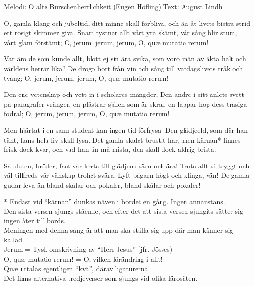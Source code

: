 \begin{song}

\begin{songmeta}
Melodi: O alte Burschenherrlichkeit (Eugen Höfling)
Text: August Lindh
\end{songmeta}

\begin{songtext}
O, gamla klang och jubeltid,
ditt minne skall förbliva,
och än åt livets bistra strid
ett rosigt skimmer giva.
Snart tystnar allt vårt yra skämt,
vår sång blir stum, vårt glam förstämt;
O, jerum, jerum, jerum,
O, quæ mutatio rerum!

Var äro de som kunde allt,
blott ej sin ära svika,
som voro män av äkta halt
och världens herrar lika?
De drogo bort från vin och sång
till vardagslivets tråk och tvång;
O, jerum, jerum, jerum,
O, quæ mutatio rerum!

Den ene vetenskap och vett
in i scholares mängder,
Den andre i sitt anlets svett
på paragrafer vränger,
en plåstrar själen som är skral,
en lappar hop dess trasiga fodral;
O, jerum, jerum, jerum,
O, quæ mutatio rerum!

Men hjärtat i en sann student
kan ingen tid förfrysa.
Den glädjeeld, som där han tänt,
hans hela liv skall lysa.
Det gamla skalet brustit har,
men kärnan* finnes frisk dock kvar,
och vad han än må mista,
den skall dock aldrig brista.

Så sluten, bröder, fast vår krets
till glädjens värn och ära!
Trots allt vi tryggt och väl tillfreds
vår vänskap trohet svära.
Lyft bägarn högt och klinga, vän!
De gamla gudar leva än
bland skålar och pokaler,
bland skålar och pokaler!
\end{songtext}

\begin{songnotes}
* Endast vid \textquotedblleft{}kärnan\textquotedblright{} dunkas näven i bordet en gång. Ingen annanstans.\\
Den sista versen sjungs stående, och efter det att sista versen sjungits sätter sig ingen åter till bords.\\
Meningen med denna sång är att man ska ställa sig upp där man känner sig kallad.\\
Jerum = Tysk omskrivning av \textquotedblleft{}Herr Jesus\textquotedblright{} (jfr. Jösses)\\
O, quæ mutatio rerum! = O, vilken förändring i allt!\\
Quæ uttalas egentligen \textquotedblleft{}kvä\textquotedblright{}, därav ligaturerna. \\
Det finns alternativa tredjeverser som sjungs vid olika lärosäten.
\end{songnotes}

\end{song}

